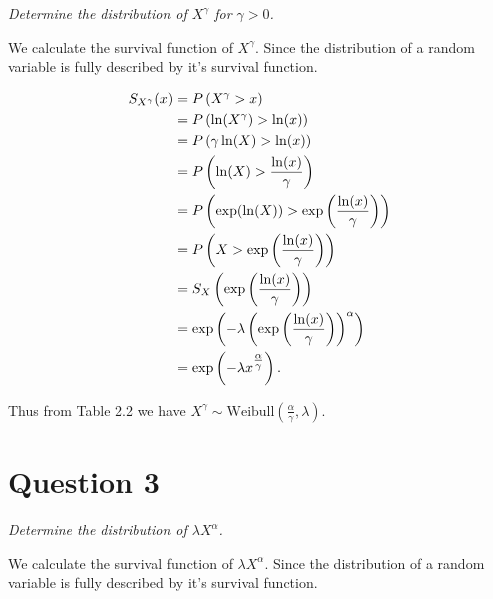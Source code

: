 \documentclass[a4paper,oneside]{memoir}
\begin{document}
\emph{Determine the distribution of \(X^\gamma\) for \(\gamma > 0\).}

We calculate the survival function of \(X^\gamma\). Since the distribution of a random variable is fully described by it's survival function.

\begin{align}
S_{X^{\gamma}}(x)&=P\left(X^\gamma>x\right) \notag\\
                 &=P\left(\ln(X^\gamma)>\ln(x)\right) \notag\\
                 &=P\left(\gamma\ln(X)>\ln(x)\right) \notag\\
                 &=P\left(\ln(X)>\frac{\ln(x)}{\gamma}\right) \notag\\
                 &=P\left(\exp(\ln(X))>\exp\left(\frac{\ln(x)}{\gamma}\right)\right) \notag\\
                 &=P\left(X>\exp\left(\frac{\ln(x)}{\gamma}\right)\right) \notag\\
                 &=S_X\left(\exp\left(\frac{\ln(x)}{\gamma}\right)\right) \notag\\
                 &=\exp\left(-\lambda \left(\exp\left(\frac{\ln(x)}{\gamma}\right)\right)^\alpha\right) \notag\\
                 &=\exp\left(-\lambda x^{\tfrac{\alpha}{\gamma}}\right). \label{eq:WeiGammaSurv}
\end{align}

Thus from Table 2.2 \citep{Klein2003} we have \(X^\gamma\sim \text{Weibull}\left(\frac{\alpha}{\gamma},\lambda\right)\).

\hypertarget{question-3}{%
\section{Question 3}\label{question-3}}

\emph{Determine the distribution of \(\lambda X^\alpha\).}

We calculate the survival function of \(\lambda X^\alpha\). Since the distribution of a random variable is fully described by it's survival function.
\end{document}
